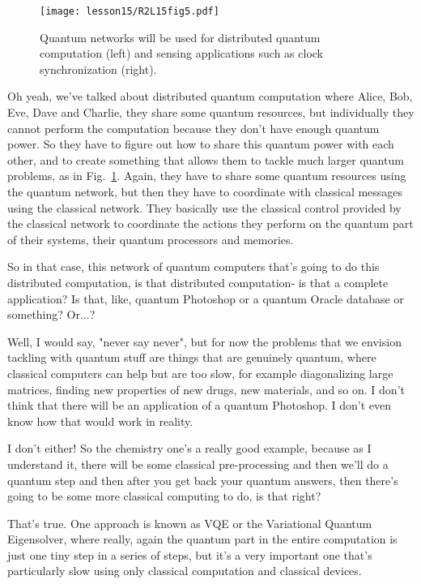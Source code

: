 \begin{figure}[t]
    \centering
    \texttt{[image: lesson15/R2L15fig5.pdf]}
    \caption[Uses of quantum networking]{Quantum networks will be used for distributed quantum computation (left) and sensing applications such as clock synchronization (right).}
    \label{fig:15-5-apps}
\end{figure}


\mmm Oh yeah, we've talked about distributed quantum computation where Alice, Bob, Eve, Dave and Charlie, they share some quantum resources, but individually they cannot perform the computation because they don't have enough quantum power. So they have to figure out how to share this quantum power with each other, and to create something that allows them to tackle much larger quantum problems, as in Fig.~\ref{fig:15-5-apps}. Again, they have to share some quantum resources using the quantum network, but then they have to coordinate with classical messages using the classical network. They basically use the classical control provided by the classical network to coordinate the actions they perform on the quantum part of their systems, their quantum processors and memories.

\rrr So in that case, this network of quantum computers that's going to do this distributed computation, is that distributed computation- is that a complete application? Is that, like, quantum Photoshop or a quantum Oracle database or something? Or...?

\mmm Well, I would say, "never say never", but for now the problems that we envision tackling with quantum stuff are things that are genuinely quantum, where classical computers can help but are too slow, for example diagonalizing large matrices, finding new properties of new drugs, new materials, and so on. I don't think that there will be an application of a quantum Photoshop. I don't even know how that would work in reality.

\rrr I don't either! So the chemistry one's a really good example, because as I understand it, there will be some classical pre-processing and then we'll do a quantum step and then after you get back your quantum answers, then there's going to be some more classical computing to do, is that right?

\mmm That's true. One approach is known as VQE or the Variational Quantum Eigensolver, where really, again the quantum part in the entire computation is just one tiny step in a series of steps, but it's a very important one that's particularly slow using only classical computation and classical devices.

